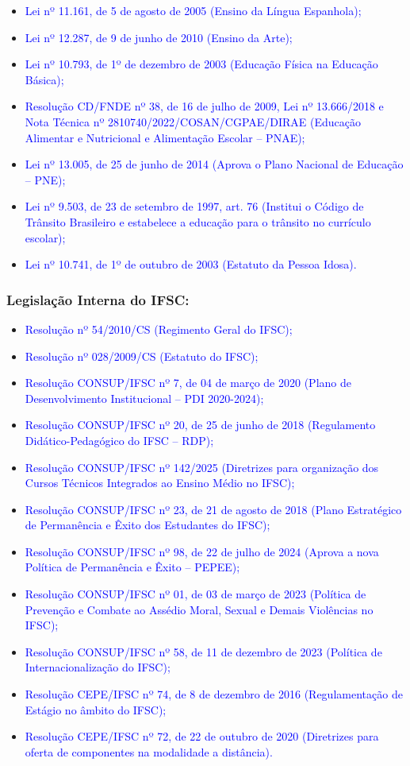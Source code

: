 \documentclass{../../modelos/latex-shared/ifsc-ppc}
\newcommand{\revisao}[1]{\textcolor{blue}{#1}}
\newcommand{\revisao}[1]{#1}
\newcommand{\semsumario}[1]{\addtocontents{toc}{\protect\setcounter{tocdepth}{2}}#1\addtocontents{toc}{\protect\setcounter{tocdepth}{4}}}
\begin{document}
\begin{itemize}
    \item \revisao{Lei nº 11.161, de 5 de agosto de 2005 (Ensino da Língua Espanhola);}
    \item \revisao{Lei nº 12.287, de 9 de junho de 2010 (Ensino da Arte);}
    \item \revisao{Lei nº 10.793, de 1º de dezembro de 2003 (Educação Física na Educação Básica);}
    \item \revisao{Resolução CD/FNDE nº 38, de 16 de julho de 2009, Lei nº 13.666/2018 e Nota Técnica nº 2810740/2022/COSAN/CGPAE/DIRAE (Educação Alimentar e Nutricional e Alimentação Escolar -- PNAE);}
    \item \revisao{Lei nº 13.005, de 25 de junho de 2014 (Aprova o Plano Nacional de Educação -- PNE);}
    \item \revisao{Lei nº 9.503, de 23 de setembro de 1997, art. 76 (Institui o Código de Trânsito Brasileiro e estabelece a educação para o trânsito no currículo escolar);}
    \item \revisao{Lei nº 10.741, de 1º de outubro de 2003 (Estatuto da Pessoa Idosa).}
\end{itemize}

\semsumario{\subsubsection{Legislação Interna do IFSC:}}
\begin{itemize}
    \item \revisao{Resolução nº 54/2010/CS (Regimento Geral do IFSC);}
    \item \revisao{Resolução nº 028/2009/CS (Estatuto do IFSC);}
    \item \revisao{Resolução CONSUP/IFSC nº 7, de 04 de março de 2020 (Plano de Desenvolvimento Institucional -- PDI 2020-2024);}
    \item \revisao{Resolução CONSUP/IFSC nº 20, de 25 de junho de 2018 (Regulamento Didático-Pedagógico do IFSC -- RDP);}
    \item \revisao{Resolução CONSUP/IFSC nº 142/2025 (Diretrizes para organização dos Cursos Técnicos Integrados ao Ensino Médio no IFSC);}
    \item \revisao{Resolução CONSUP/IFSC nº 23, de 21 de agosto de 2018 (Plano Estratégico de Permanência e Êxito dos Estudantes do IFSC);}
    \item \revisao{Resolução CONSUP/IFSC nº 98, de 22 de julho de 2024 (Aprova a nova Política de Permanência e Êxito -- PEPEE);}
    \item \revisao{Resolução CONSUP/IFSC nº 01, de 03 de março de 2023 (Política de Prevenção e Combate ao Assédio Moral, Sexual e Demais Violências no IFSC);}
    \item \revisao{Resolução CONSUP/IFSC nº 58, de 11 de dezembro de 2023 (Política de Internacionalização do IFSC);}
    \item \revisao{Resolução CEPE/IFSC nº 74, de 8 de dezembro de 2016 (Regulamentação de Estágio no âmbito do IFSC);}
    \item \revisao{Resolução CEPE/IFSC nº 72, de 22 de outubro de 2020 (Diretrizes para oferta de componentes na modalidade a distância).}
\end{itemize}
\end{document}
